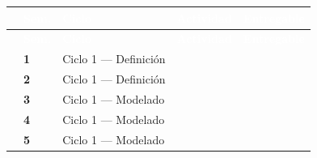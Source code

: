 \documentclass[11pt,letterpaper]{article}
\begin{document}
\begin{longtable}{
    @{}p{3pt}
    >{\centering\arraybackslash}p{1.1cm}
    p{3.4cm}
    p{7.5cm}
    >{\centering\arraybackslash}p{2.1cm}@{}
}

\rowcolor{hdrbg}
& \textcolor{white}{\footnotesize\textbf{Sem.}}
& \textcolor{white}{\footnotesize\textbf{Ciclo}}
& \textcolor{white}{\footnotesize\textbf{Actividad}}
& \textcolor{white}{\footnotesize\textbf{Entregable}} \\
\endfirsthead
\rowcolor{hdrbg}
& \textcolor{white}{\footnotesize\textbf{Sem.}}
& \textcolor{white}{\footnotesize\textbf{Ciclo}}
& \textcolor{white}{\footnotesize\textbf{Actividad}}
& \textcolor{white}{\footnotesize\textbf{Entregable}} \\
\endhead
\endfoot
\endlastfoot


\cellcolor{az1bar} & \cellcolor{az1bg}\textcolor{az1bar}{\textbf{1}}
& \cellcolor{az1bg}\textcolor{az1txt}{\footnotesize Ciclo 1 — Definición}
& \cellcolor{az1bg}{\footnotesize Revisión bibliográfica sobre telarañas orbiculares, dinámica vibratoria y sistemas mecánicos discretos.}
& \cellcolor{az1bg} \\

\cellcolor{az1bar} & \cellcolor{az1alt}\textcolor{az1bar}{\textbf{2}}
& \cellcolor{az1alt}\textcolor{az1txt}{\footnotesize Ciclo 1 — Definición}
& \cellcolor{az1alt}{\footnotesize Configuración geométrica inicial: distribución de nodos, elementos estructurales y variables de interés.}
& \cellcolor{az1alt} \\

\cellcolor{az1bar} & \cellcolor{az1bg}\textcolor{az1bar}{\textbf{3}}
& \cellcolor{az1bg}\textcolor{az1txt}{\footnotesize Ciclo 1 — Modelado}
& \cellcolor{az1bg}{\footnotesize Representación 3D. Grados de libertad y coordenadas generalizadas $\mathbf{q}$.}
& \cellcolor{az1bg} \\

\cellcolor{az1bar} & \cellcolor{az1alt}\textcolor{az1bar}{\textbf{4}}
& \cellcolor{az1alt}\textcolor{az1txt}{\footnotesize Ciclo 1 — Modelado}
& \cellcolor{az1alt}{\footnotesize Formulación de $T$ y $V$ con pretensión. Derivación de la matriz elemental $\mathbf{k}^e_{ij}$.}
& \cellcolor{az1alt} \\

\cellcolor{az1bar} & \cellcolor{az1bg}\textcolor{az1bar}{\textbf{5}}
& \cellcolor{az1bg}\textcolor{az1txt}{\footnotesize Ciclo 1 — Modelado}
& \cellcolor{az1bg}{\footnotesize Ensamblaje de $\mathbf{M}$ y $\mathbf{K}$; verificación del modelo lagrangiano.}
& \cellcolor{az1bg} \\


\end{longtable}
\end{document}
